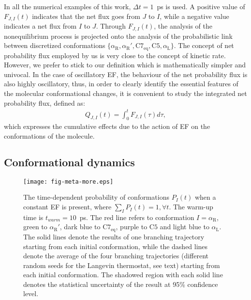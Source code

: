 \documentclass[journal=jctcce,manuscript=manuscript]{achemso}
\newcommand{\confaa}[0]{{\alpha_{\textrm{R}}}}
\newcommand{\confab}[0]{{\alpha_{\textrm{R}}'}}
\newcommand{\confba}[0]{{\textrm{C}7_{\textrm{eq}}}}
\newcommand{\confbb}[0]{{\textrm{C}5}}
\newcommand{\confc}[0]{{\alpha_{\textrm{L}}}}
\begin{document}
{In all the numerical examples of this work, $\Delta t = 1$~ps is used}.
A positive value of $F_{J,I}(t)$ indicates that the
net flux goes from $J$ to $I$,
while a negative value indicates a net flux from $I$ to $J$.
Through $F_{J,I}(t)$, the analysis of the nonequilibrium process 
is projected onto the analysis of the probabilistic link between discretized conformations $\{\confaa, \confab, \confba, \confbb, \confc\}$.
The concept of net probability flux employed by us is very close to the
  concept of kinetic rate.  However, we prefer to stick to our definition which
is mathematically simpler and univocal.
In the case of oscillatory EF, the behaviour of the net probability flux is also highly oscillatory, thus, in order to clearly identify the essential features of the molecular conformational changes, it is convenient to study the integrated net probability flux, defined as:
\begin{align}\label{eqn:tmp7a}
  Q_{J,I} (t) = \int_0^t F_{J,I}(\tau)d \tau,
\end{align}
which expresses the cumulative effects due to the action of EF on the conformations of the molecule.


\subsection{Conformational dynamics}


\begin{figure}
  \centering
  \texttt{[image: fig-meta-more.eps]}
  \caption{The time-dependent probability of conformations $P_I(t)$ 
    when a constant EF is present, where $\sum_I P_I(t) = 1, \forall t$.
    The warm-up time is $t_{warm} = 10$~ps. The red line refers to conformation $I = \confaa$,
    green to $\confab$, dark blue to $\confba$, purple to $\confbb$ and light blue
    to $\confc$. {
      The solid lines denote the results of one branching trajectory
      starting from each initial conformation, while the dashed lines denote
      the average of the four branching trajectories (different random seeds for the Langevin thermostat, see text) starting from each initial
      conformation.
      The shadowed region with each solid line denotes the
      statistical uncertainty of the result at 95\% confidence level.
    }
  }
  \label{fig:tmp5}
\end{figure}
\end{document}
